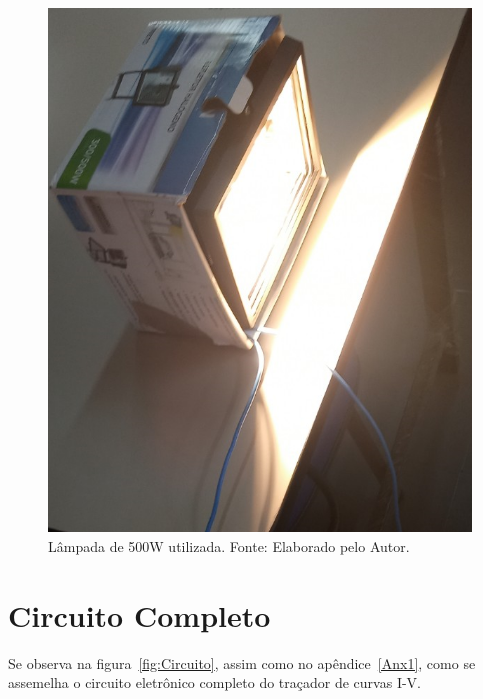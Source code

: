 \FloatBarrier
\begin{figure}[!htbp]
	\centering
	\includegraphics[scale=0.65]{imagens/Lamp.png}
	\caption{Lâmpada de 500W utilizada. Fonte: Elaborado pelo Autor. 	}
	\label{fig:Lamp}
\end{figure}
\FloatBarrier


\section{Circuito Completo}

Se observa na figura~\ref{fig:Circuito}, assim como no apêndice~\ref{Anx1}, como se assemelha o circuito eletrônico completo do traçador de curvas I-V.


